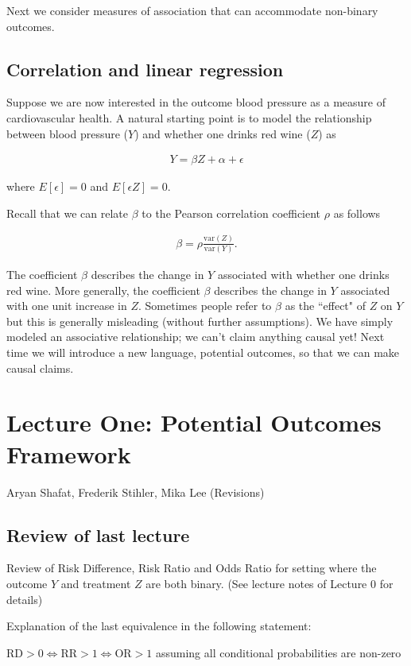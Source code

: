 Next we consider measures of association that can accommodate non-binary outcomes. 

\subsection{Correlation and linear regression}
Suppose we are now interested in the outcome blood pressure as a measure of cardiovascular health. A natural starting point is to model the relationship between blood pressure ($Y$) and whether one drinks red wine ($Z$) as 

\begin{align*}
    Y = \beta Z + \alpha + \epsilon
\end{align*}

where $E[\epsilon] = 0 $ and $E[\epsilon Z ] = 0$.

Recall that we can relate $\beta$ to the Pearson correlation coefficient $\rho$ as follows

\begin{align*}
    \beta = \rho \frac{\mathrm{var}(Z)}{\mathrm{var}(Y)}.
\end{align*}

The coefficient $\beta$ describes the change in $Y$ associated with whether one drinks red wine. More generally, the coefficient $\beta$ describes the change in $Y$ associated with one unit increase in $Z$.
Sometimes people refer to $\beta$ as the ``effect" of $Z$ on $Y$ but this is generally misleading (without further assumptions). We have simply modeled an associative relationship; we can't claim anything causal yet! Next time we will introduce a new language, potential outcomes, so that we can make causal claims.


\section{Lecture One: Potential Outcomes Framework}{Aryan Shafat, Frederik Stihler, Mika Lee (Revisions)}

\subsection{Review of last lecture}\label{sec:review}
Review of Risk Difference, Risk Ratio and Odds Ratio for setting where the outcome $Y$ and treatment $Z$ are both binary. (See lecture notes of Lecture 0 for details)

Explanation of the last equivalence in the following statement:
\begin{center}
$\mathrm{RD} > 0 \Longleftrightarrow \mathrm{RR} > 1 \Longleftrightarrow \mathrm{OR} > 1$ assuming all conditional probabilities are non-zero
\end{center}

